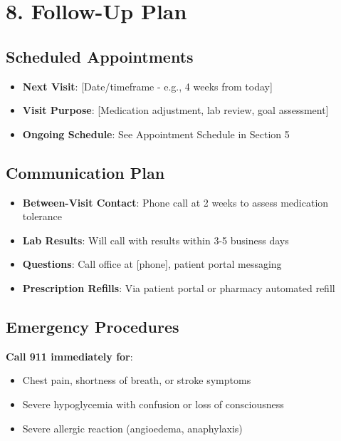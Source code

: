 \documentclass[11pt,letterpaper]{article}
\begin{document}
\section*{8. Follow-Up Plan}

\subsection*{Scheduled Appointments}

\begin{itemize}[leftmargin=*]
    \item \textbf{Next Visit}: [Date/timeframe - e.g., 4 weeks from today]
    \item \textbf{Visit Purpose}: [Medication adjustment, lab review, goal assessment]
    \item \textbf{Ongoing Schedule}: See Appointment Schedule in Section 5
\end{itemize}

\subsection*{Communication Plan}

\begin{itemize}[leftmargin=*]
    \item \textbf{Between-Visit Contact}: Phone call at 2 weeks to assess medication tolerance
    \item \textbf{Lab Results}: Will call with results within 3-5 business days
    \item \textbf{Questions}: Call office at [phone], patient portal messaging
    \item \textbf{Prescription Refills}: Via patient portal or pharmacy automated refill
\end{itemize}

\subsection*{Emergency Procedures}

\textbf{Call 911 immediately for}:
\begin{itemize}[leftmargin=*]
    \item Chest pain, shortness of breath, or stroke symptoms
    \item Severe hypoglycemia with confusion or loss of consciousness
    \item Severe allergic reaction (angioedema, anaphylaxis)
\end{itemize}
\end{document}
